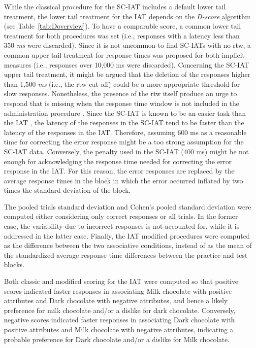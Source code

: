 \documentclass[12pt]{book}
\begin{document}
While the classical procedure for the SC-IAT includes a default lower tail treatment, the lower tail treatment for the IAT depends on the \emph{D-score} algorithm (see Table~\ref{tab:Doverview}). To have a comparable score, a common lower tail treatment for both procedures was set (i.e., responses with a latency less than 350 \emph{ms} were discarded). Since it is not uncommon to find SC-IATs with no rtw, a common upper tail treatment for response times was proposed for both implicit measures (i.e., responses over 10,000 ms were discarded). Concerning the SC-IAT upper tail treatment, it might be argued that the deletion of the responses higher than 1,500 \emph{ms} (i.e., the rtw cut-off) could be a more appropriate threshold for slow responses. Nonetheless, the presence of the rtw itself produce an urge to respond that is missing when the response time window is not included in the administration procedure \cite{karpinski2006}. 
Since the SC-IAT is known to be an easier task than the IAT \cite{karpinski2006}, the latency of the responses in the SC-IAT tend to be faster than the latency of the responses in the IAT. Therefore, assuming 600 ms as a reasonable time for correcting the error response might be a too strong assumption for the SC-IAT data. Conversely, the penalty used in the SC-IAT (400 ms) might be not enough for acknowledging the response time needed for correcting the error response in the IAT. For this reason, the error responses are replaced by the average response times in the block in which the error occurred inflated by two times the standard deviation of the block.  

The pooled trials standard deviation and Cohen’s pooled standard deviation were computed either considering only correct responses or all trials. In the former case, the variability due to incorrect responses is not accounted for, while it is addressed in the latter case.
Finally, the IAT modified procedures were computed as the difference between the two associative conditions, instead of as the mean of the standardized average response time differences between the practice and test blocks.

Both classic and modified scoring for the IAT were computed so that positive scores indicated faster responses in associating Milk chocolate with positive attributes and Dark chocolate with negative attributes, and hence a likely preference for milk chocolate and/or a dislike for dark chocolate. Conversely, negative scores indicated faster responses in associating Dark chocolate with positive attributes and Milk chocolate with negative attributes, indicating a probable preference for Dark chocolate and/or a dislike for Milk chocolate. 
\end{document}
